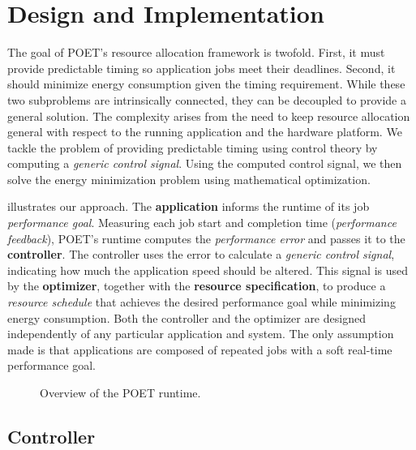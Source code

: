 \section{Design and Implementation}
\label{sec:poet-framework}

The goal of POET's resource allocation framework is twofold.
First, it must provide predictable timing so application jobs meet their deadlines.
Second, it should minimize energy consumption given the timing requirement.
While these two subproblems are intrinsically connected, they can be decoupled to provide a general solution.
The complexity arises from the need to keep resource allocation general with respect to the running application and the hardware platform.
We tackle the problem of providing predictable timing using control theory by computing a \emph{generic control signal}.
Using the computed control signal, we then solve the energy minimization problem using mathematical optimization.

 illustrates our approach.
The \textbf{application} informs the runtime of its job \emph{performance goal}.
Measuring each job start and completion time (\emph{performance feedback}), POET's runtime computes the \emph{performance error} and passes it to the \textbf{controller}.
The controller uses the error to calculate a \emph{generic control signal}, indicating how much the application speed should be altered.
This signal is used by the \textbf{optimizer}, together with the \textbf{resource specification}, to produce a \emph{resource schedule} that achieves the desired performance goal while minimizing energy consumption.
Both the controller and the optimizer are designed independently of any particular application and system.
The only assumption made is that applications are composed of repeated jobs with a soft real-time performance goal.

\begin{figure}[t]
  \centering
  
  \caption{Overview of the POET runtime.}
  \label{fig:poet-runtime}
\end{figure}


\subsection{Controller}

